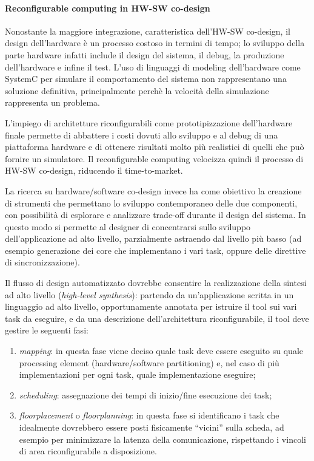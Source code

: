 \paragraph{Reconfigurable computing in HW-SW co-design}
Nonostante la maggiore integrazione, caratteristica dell'HW-SW co-design, il design dell'hardware
è un processo costoso in termini di tempo; lo sviluppo della parte hardware infatti include il
design del sistema, il debug, la produzione dell'hardware e infine il test. L'uso di linguaggi
di modeling dell'hardware come SystemC \cite{SystemCBook} per simulare il comportamento del
sistema non rappresentano una soluzione definitiva, principalmente perchè la velocità della
simulazione rappresenta un problema.

L'impiego di architetture riconfigurabili come prototipizzazione dell'hardware finale permette
di abbattere i costi dovuti allo sviluppo e al debug di una piattaforma hardware e di ottenere
risultati molto più realistici di quelli che può fornire un simulatore. Il reconfigurable
computing velocizza quindi il processo di HW-SW co-design, riducendo il time-to-market.


La ricerca su 
\mbox{hardware/software} co-design invece ha come obiettivo la creazione di strumenti che 
permettano lo sviluppo contemporaneo delle due componenti, con possibilità di esplorare e 
analizzare trade-off durante il design del sistema. In questo modo si permette al 
designer di concentrarsi sullo sviluppo dell'applicazione ad alto livello, parzialmente 
astraendo dal livello più basso (ad esempio generazione dei core che implementano i vari 
task, oppure delle direttive di sincronizzazione).

Il flusso di design automatizzato dovrebbe consentire la realizzazione della sintesi ad 
alto livello (\emph{high-level synthesis}): partendo da un'applicazione scritta in un
linguaggio ad alto livello, opportunamente annotata per istruire il tool sui vari task
da eseguire, e da una descrizione dell'architettura riconfigurabile, il tool deve gestire
le seguenti fasi:
\begin{enumerate}
 \item \emph{mapping}: in questa fase viene deciso quale task deve essere eseguito su 
quale processing 
element (\mbox{hardware/software} partitioning) e, nel caso di più implementazioni per 
ogni task, quale implementazione eseguire;
 \item \emph{scheduling}: assegnazione dei tempi di inizio/fine esecuzione dei task;
 \item \emph{floorplacement} o \emph{floorplanning}: in questa fase si identificano i 
task che idealmente dovrebbero essere posti fisicamente ``vicini'' sulla scheda, ad 
esempio per minimizzare la latenza della comunicazione, rispettando i vincoli di area 
riconfigurabile a disposizione.
\end{enumerate}

